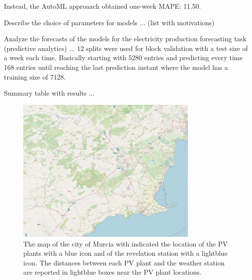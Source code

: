 Instead, the AutoML approaach obtained one-week MAPE: 11.50.



Describe the choice of parameters for models ... (list with motivations)

Analyze the forecasts of the models for the electricity production forecasting task (predictive analytics) ...
12 splits were used for block validation with a test size of a week each time.
Basically starting with 5280 entries and predicting every time 168 entries until reaching the last prediction instant where the model has a training size of 7128.

Summary table with results ...

\begin{figure}[H]
\centering
\includegraphics[width=0.8\textwidth]{images/production/pv_plants_map}
\caption{The map of the city of Murcia with indicated the location of the PV plants with a blue icon and of the revelation station with a lightblue icon. The distances between each PV plant and the weather station are reported in lightblue boxes near the PV plant locations.}
\label{fig:pvplantsmap}
\end{figure}


